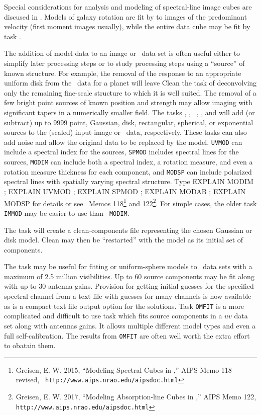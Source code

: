 
     Special considerations for analysis and modeling of spectral-line
image cubes are discused in .  Models of galaxy rotation
are fit by {\tt {}} to images of the predominant velocity
(first moment images usually), while the entire data cube may be fit
by task {\tt {}}\@.

     The addition of model data to an image or \uv\ data set is often
useful either to simplify later processing steps or to study
processing steps using a ``source'' of known structure.  For example,
the removal of the response to an appropriate uniform disk from the
\uv\ data for a planet will leave Clean the task of deconvolving only
the remaining fine-scale structure to which it is well suited.  The
removal of a few bright point sources of known position and strength
may allow imaging with significant tapers in a numerically smaller
field.  The tasks {\tt {}}, {\tt {}}, {\tt
{}}, {\tt {}}, and {\tt {}} will add (or
subtract) up to 9999 point, Gaussian, disk, rectangular, spherical, or
exponential sources to the (scaled) input image or \uv\ data,
respectively.  These tasks can also add noise and allow the original
data to be replaced by the model.  {\tt UVMOD} can include a spectral
index for the sources, {\tt SPMOD} includes spectral lines for the
sources, {\tt MODIM} can include both a spectral index, a rotation
measure, and even a rotation measure thickness for each component, and
{\tt MODSP} can include polarized spectral lines with spatially
varying spectral structure. Type {\us EXPLAIN MODIM ; EXPLAIN UVMOD ;
EXPLAIN SPMOD ; EXPLAIN MODAB ; EXPLAIN MODSP \CR} for details or see
\AIPS\ Memos 118\footnote{Greisen, E. W. 2015, ``Modeling Spectral
Cubes in \AIPS,'' AIPS Memo 118 revised, {\tt
http://www.aips.nrao.edu/aipsdoc.html}} and 122\footnote{Greisen, E. W.
2017, ``Modeling Absorption-line Cubes in \AIPS,'' AIPS Memo 122, {\tt
http://www.aips.nrao.edu/aipsdoc.html}}.  For simple cases, the older
task {\tt IMMOD} may be easier to use than {\tt
MODIM}\@.

     The task {\tt {}} will create a clean-components file
representing the chosen Gaussian or disk model.  Clean may then be
``restarted'' with the model as its initial set of components.

The task {\tt {}} may be useful for fitting 
or uniform-sphere models to \uv\ data sets with a maximum of 2.5
million visibilities.  Up to 60 source components may be fit along
with up to 30 antenna gains.  Provision for getting initial guesses
for the specified spectral channel from a text file with guesses for
many channels is now available as is a compact text file output option
for the solutions.  Task {\tt OMFIT} is a more complicated and
difficult to use task which fits source components in a $uv$ data set
along with antennas gains.  It allows multiple different model types
and even a full self-calibration.  The results from {\tt OMFIT} are
often well worth the extra effort to obatain them.

